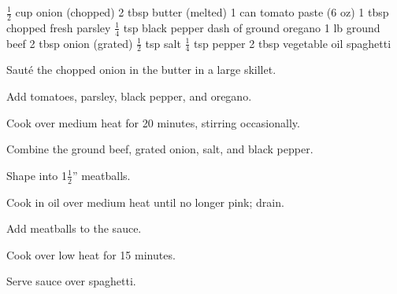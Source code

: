 \dishtype{}
\begin{ingreds}
    $\frac{1}{2}$ cup onion (chopped)
    2 tbsp butter (melted)
    1 can tomato paste (6 oz)
    1 tbsp chopped fresh parsley
    $\frac{1}{4}$ tsp black pepper
    dash of ground oregano
    1 lb ground beef
    2 tbsp onion (grated)
    $\frac{1}{2}$ tsp salt
    $\frac{1}{4}$ tsp pepper
    2 tbsp vegetable oil
    spaghetti
\end{ingreds}
\begin{method}
    Saut\'e the chopped onion in the butter in a large skillet.\par
    Add tomatoes, parsley, black pepper, and oregano.\par
    Cook over medium heat for 20 minutes, stirring occasionally.\par
    Combine the ground beef, grated onion, salt, and black pepper.\par
    Shape into 1$\frac{1}{2}$'' meatballs.\par
    Cook in oil over medium heat until no longer pink; drain.\par
    Add meatballs to the sauce.\par
    Cook over low heat for 15 minutes.\par
    Serve sauce over spaghetti.
\end{method}
